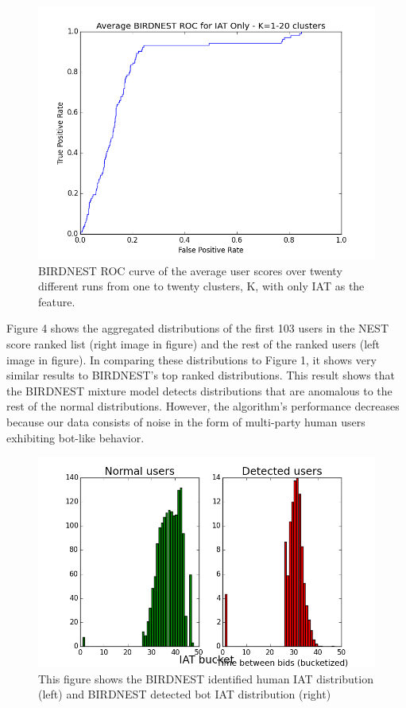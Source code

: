 \documentclass{article} %
\begin{document}
\begin{figure}[h]
\centering
{\caption{BIRDNEST ROC curve of the average user scores over twenty different runs from one to twenty clusters, K, with only IAT as the feature.} \includegraphics[scale=0.47]{img/bird_iat_roc.png}}
\end{figure}

Figure 4 shows the aggregated distributions of the first 103 users in the NEST score ranked list (right image in figure) and the rest of the ranked users (left image in figure). In comparing these distributions to Figure 1, it shows very similar results to BIRDNEST's top ranked distributions. This result shows that the BIRDNEST mixture model detects distributions that are anomalous to the rest of the normal distributions. However, the algorithm's performance decreases because our data consists of noise in the form of multi-party human users exhibiting bot-like behavior.

\begin{figure}[h]
\centering
{\caption{This figure shows the BIRDNEST identified human IAT distribution (left) and BIRDNEST detected bot IAT distribution (right)} \includegraphics[scale=0.5]{img/bird_iat_pred.png}}
\end{figure}
\end{document}
